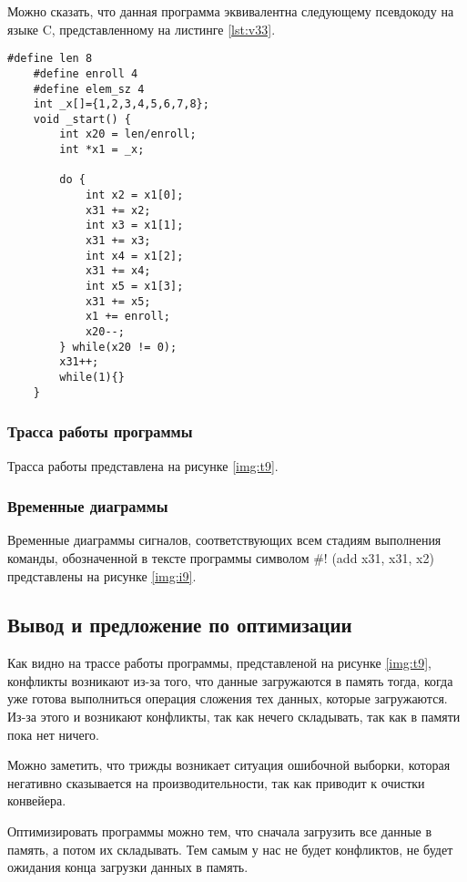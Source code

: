 \clearpage
Можно сказать, что данная программа эквивалентна следующему псевдокоду на языке C, представленному на листинге \ref{lst:v33}.

\begin{lstlisting}[label=lst:v33,caption=Псевдокод программы 9 варианта]
	#define len 8
	#define enroll 4
	#define elem_sz 4
	int _x[]={1,2,3,4,5,6,7,8};
	void _start() {
		int x20 = len/enroll;
		int *x1 = _x;
		
		do {
			int x2 = x1[0];
			x31 += x2;
			int x3 = x1[1];
			x31 += x3;
			int x4 = x1[2];
			x31 += x4;
			int x5 = x1[3];
			x31 += x5;
			x1 += enroll;
			x20--;
		} while(x20 != 0);
		x31++;
		while(1){}
	}
\end{lstlisting}


\subsubsection*{Трасса работы программы}
Трасса работы представлена на рисунке \ref{img:t9}.
\clearpage

\subsubsection*{Временные диаграммы}
Временные диаграммы сигналов, соответствующих всем стадиям выполнения команды, обозначенной в тексте программы символом \#! (add x31, x31, x2) представлены на рисунке \ref{img:i9}.

\subsection*{Вывод и предложение по оптимизации}
Как видно на трассе работы программы, представленой на рисунке \ref{img:t9}, конфликты возникают из-за того, что данные загружаются в память тогда, когда уже готова выполниться операция сложения тех данных, которые загружаются. Из-за этого и возникают конфликты, так как нечего складывать, так как в памяти пока нет ничего. 

Можно заметить, что трижды возникает ситуация ошибочной выборки, которая негативно сказывается на производительности, так как приводит к очистки конвейера.

Оптимизировать программы можно тем, что сначала загрузить все данные в память, а потом их складывать. Тем самым у нас не будет конфликтов, не будет ожидания конца загрузки данных в память.

